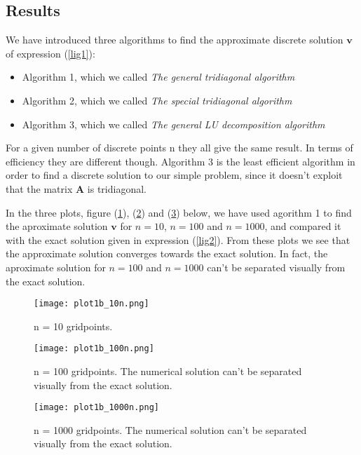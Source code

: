 \documentclass[11pt]{article}
\begin{document}
\subsection*{Results}
We have introduced three algorithms to find the approximate discrete solution $\mathbf{v}$
of expression (\ref{lig1}):
\begin{itemize}
\item Algorithm 1, which we called \emph{The general tridiagonal algorithm}
\item Algorithm 2, which we called \emph{The special tridiagonal algorithm}
\item Algorithm 3, which we called \emph{The general LU decomposition algorithm} 
\end{itemize}
For a given number of discrete points n they all give the same result. In terms of
efficiency they are different though. Algorithm 3 is the least efficient algorithm
in order to find a discrete solution to our simple problem, since it doesn't exploit that
the matrix $\mathbf A$ is tridiagonal.

\vspace{4mm}
\noindent
In the three plots, figure (\ref{fig:plott1}), (\ref{fig:plott2}) and (\ref{fig:plott3}) below, 
we have used  agorithm 1 to find the aproximate solution 
$\mathbf{v}$ for $n = 10$, $n = 100$ and $n = 1000$, and compared it with the exact 
solution given in expression (\ref{lig2}). From these plots we see that the approximate solution
converges towards the exact solution. In fact, the aproximate solution for $n = 100$ and
$n = 1000$ can't be separated visually from the exact solution.

\begin{figure}[H]
\centering
\texttt{[image: plot1b\_10n.png]}

\caption{n = 10 gridpoints.}
\label{fig:plott1}
\end{figure}

\begin{figure}[H]
\centering
\texttt{[image: plot1b\_100n.png]}

\caption{n = 100 gridpoints. The numerical solution can't be separated visually 
from the exact solution.}
\label{fig:plott2}
\end{figure}

\begin{figure}[H]
\centering
\texttt{[image: plot1b\_1000n.png]}

\caption{n = 1000 gridpoints. The numerical solution can't be separated visually 
from the exact solution.}
\label{fig:plott3}
\end{figure}
\end{document}
